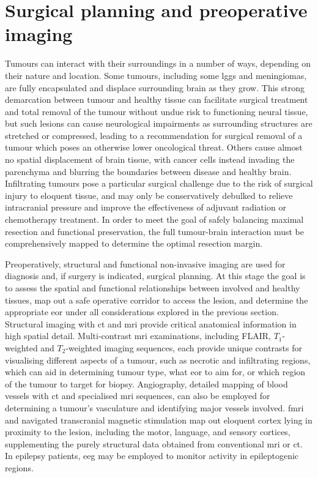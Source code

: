 
\section{Surgical planning and preoperative imaging}

Tumours can interact with their surroundings in a number of ways, depending on their nature and location.
Some tumours, including some \glspl{lgg} and meningiomas, are fully encapsulated and displace surrounding brain as they grow.
This strong demarcation between tumour and healthy tissue can facilitate surgical treatment and total removal of the tumour without undue risk to functioning neural tissue, but such lesions can cause neurological impairments as surrounding structures are stretched or compressed, leading to a recommendation for surgical removal of a tumour which poses an otherwise lower oncological threat.
Others cause almost no spatial displacement of brain tissue, with cancer cells instead invading the parenchyma and blurring the boundaries between disease and healthy brain.
Infiltrating tumours pose a particular surgical challenge due to the risk of surgical injury to eloquent tissue, and may only be conservatively debulked to relieve intracranial pressure and improve the effectiveness of adjuvant radiation or chemotherapy treatment.
In order to meet the goal of safely balancing maximal resection and functional preservation, the full tumour-brain interaction must be comprehensively mapped to determine the optimal resection margin.

Preoperatively, structural and functional non-invasive imaging are used for diagnosis and, if surgery is indicated, surgical planning.
At this stage the goal is to assess the spatial and functional relationships between involved and healthy tissues, map out a safe operative corridor to access the lesion, and determine the appropriate \gls{eor} under all considerations explored in the previous section.
Structural imaging with \gls{ct} and \gls{mri} provide critical anatomical information in high spatial detail.
Multi-contrast \gls{mri} examinations, including FLAIR, $T_1$-weighted and $T_2$-weighted imaging sequences, each provide unique contrasts for visualising different aspects of a tumour, such as necrotic and infiltrating regions, which can aid in determining tumour type, what \gls{eor} to aim for, or which region of the tumour to target for biopsy.
Angiography, detailed mapping of blood vessels with \gls{ct} and specialised \gls{mri} sequences, can also be employed for determining a tumour's vasculature and identifying major vessels involved\autocite{Kashimura2008,Kim2019}.
\Gls{fmri} and navigated transcranial magnetic stimulation \autocite{WeissLucas2020} map out eloquent cortex lying in proximity to the lesion, including the motor, language, and sensory cortices, supplementing the purely structural data obtained from conventional \gls{mri} or \gls{ct}.
In epilepsy patients, \gls{eeg} may be employed to monitor activity in epileptogenic regions\autocite{Sarco2006}.


